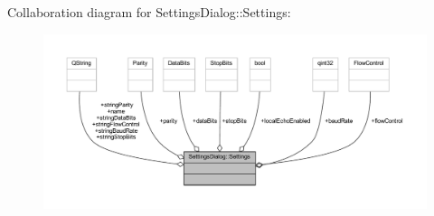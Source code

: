 Collaboration diagram for Settings\+Dialog\+:\+:Settings\+:
\nopagebreak
\begin{figure}[H]
\begin{center}
\leavevmode
\includegraphics[width=350pt]{db/d53/a00202}
\end{center}
\end{figure}
